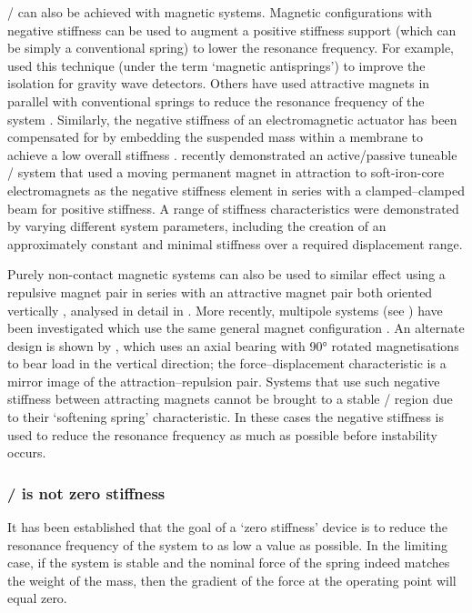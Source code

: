 \documentclass[11pt,a4paper]{memoir}
\begin{document}
\QZS/ can also be achieved with magnetic systems.
Magnetic configurations with negative stiffness can be used to augment a positive stiffness support (which can be simply a conventional spring) to lower the resonance frequency.
For example, \textcite{beccaria1997} used this technique (under the term `magnetic antisprings') to improve the isolation for gravity wave detectors.
Others have used attractive magnets in parallel with conventional springs to reduce the resonance frequency of the system \parencite{carrella2008-jsv}.
Similarly, the negative stiffness of an electromagnetic actuator has been compensated for by embedding the suspended mass within a membrane to achieve a low overall stiffness \cite{sato2001}.
\textcite{zhou2010-jsv} recently demonstrated an active/passive tuneable \qzs/ system that used a moving permanent magnet in attraction to soft-iron-core electromagnets as the negative stiffness element in series with a clamped--clamped beam for positive stiffness.
A range of stiffness characteristics were demonstrated by varying different system parameters, including the creation of an approximately constant and minimal stiffness over a required displacement range.

Purely non-contact magnetic systems can also be used to similar effect using a repulsive magnet pair in series with an attractive magnet pair both oriented vertically \cite{robertson2006-activeconf,robertson2007-icsv}, analysed in detail in .
More recently, multipole systems (see ) have been investigated which use the same general magnet configuration \cite{janssen2009-jsdd}.
An alternate design is shown by \textcite{hol2006}, which uses an axial bearing with \ang{90} rotated magnetisations to bear load in the vertical direction; the force--displacement characteristic is a mirror image of the attraction--repulsion pair.
Systems that use such negative stiffness between attracting magnets cannot be brought to a stable \qzs/ region due to their `softening spring' characteristic.
In these cases the negative stiffness is used to reduce the resonance frequency as much as possible before instability occurs.

\subsubsection{\QZS/ is not zero stiffness}

It has been established that the goal of a `zero stiffness' device is to reduce the resonance frequency of the system to as low a value as possible.
In the limiting case, if the system is stable and the nominal force of the spring indeed matches the weight of the mass, then the gradient of the force at the operating point will equal zero.
\end{document}
